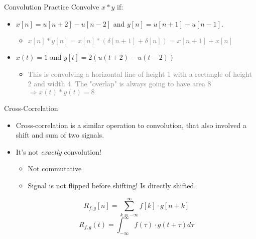 \begin{frame}{Convolution Practice}
    Convolve $x*y$ if:
    \begin{itemize}
        \item $x[n] = u[n+2]-u[n-2]$ and $y[n]=u[n+1]-u[n-1]$.
        \begin{itemize}
            \item \textcolor{gray}{$x[n]*y[n]=x[n]*(\delta[n+1]+\delta[n])=x[n+1]+x[n]$}
            \begin{figure}[H]
            \centering
          \end{figure}
        \end{itemize}
        \item $x(t) = 1$ and $y[t] = 2(u(t+2)-u(t-2))$
        \begin{itemize}
            \item \textcolor{gray}{This is convolving a horizontal line of height 1 with a rectangle of height 2 and width 4. The "overlap" is always going to have area 8 $\Rightarrow x(t)*y(t)=8$}
        \end{itemize}
    \end{itemize}
\end{frame}
\begin{frame}{Cross-Correlation}
    \begin{itemize}
        \item Cross-correlation is a similar operation to convolution, that also involved a shift and sum of two signals. 
        \item It's not \textit{exactly} convolution! 
        \begin{itemize}
            \item Not commutative
            \item Signal is not flipped before shifting! Is directly shifted. 
        \end{itemize}
            \[
                R_{f,g}[n] = \sum_{k=-\infty}^{\infty} f[k]\cdot g[n+k]
            \]
            \[
                R_{f,g}(t) = \int_{-\infty}^{\infty} f(\tau) \cdot g(t+ \tau) d\tau
            \]
    \end{itemize}
\end{frame}

